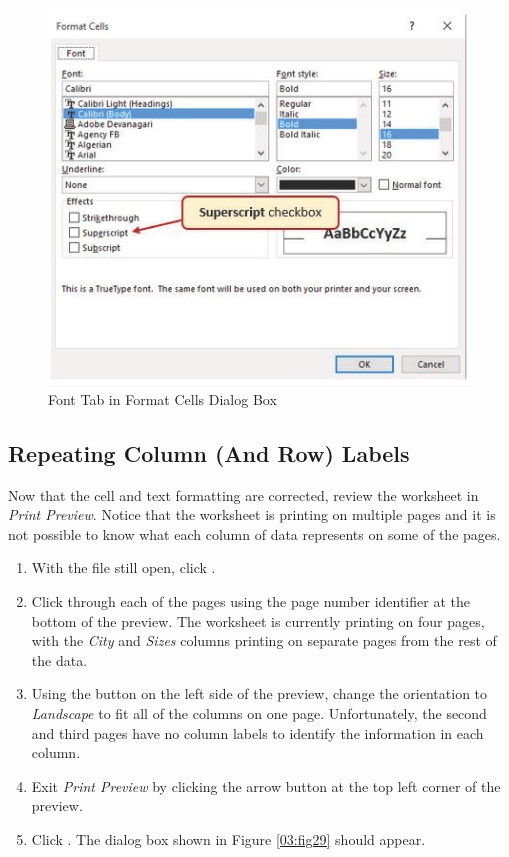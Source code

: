 \begin{figure}[H]
	\centering
	\includegraphics[width=\maxwidth{.95\linewidth}]{gfx/ch03_fig28}
	\caption{Font Tab in Format Cells Dialog Box}
	\label{03:fig28}
\end{figure}

\subsection{Repeating Column (And Row) Labels}

Now that the cell and text formatting are corrected, review the worksheet in \textit{Print Preview}. Notice that the worksheet is printing on multiple pages and it is not possible to know what each column of data represents on some of the pages.

\begin{enumerate}
	\item With the  file still open, click .
	\item Click through each of the pages using the page number identifier at the bottom of the preview. The worksheet is currently printing on four pages, with the \textit{City} and \textit{Sizes} columns printing on separate pages from the rest of the data.
	\item Using the  button on the left side of the preview, change the orientation to \textit{Landscape} to fit all of the columns on one page. Unfortunately, the second and third pages have no column labels to identify the information in each column. 
	\item Exit \textit{Print Preview} by clicking the arrow button at the top left corner of the preview.
	\item Click . The dialog box shown in Figure \ref{03:fig29} should appear.
\end{enumerate}

